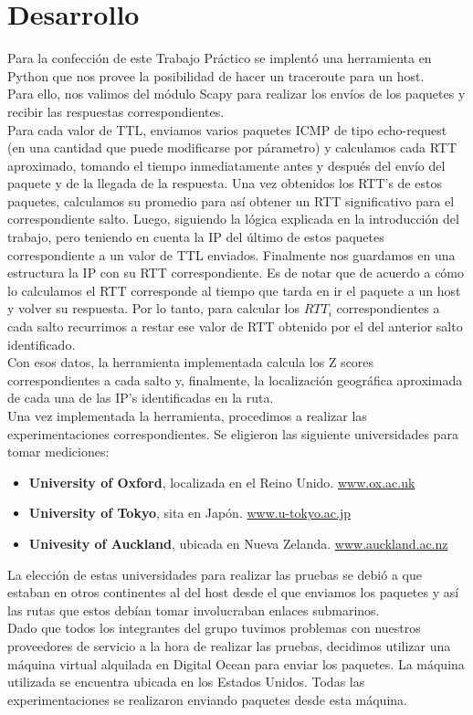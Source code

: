 \section{Desarrollo}

\indent \indent Para la confección de este Trabajo Práctico se implentó una herramienta en Python que nos provee la posibilidad de hacer un traceroute para un host. \\
\indent Para ello, nos valimos del módulo Scapy para realizar los envíos de los paquetes y recibir las respuestas correspondientes.\\
\indent Para cada valor de TTL, enviamos varios paquetes ICMP de tipo echo-request (en una cantidad que puede modificarse por párametro) y calculamos cada RTT aproximado, tomando el tiempo inmediatamente antes y después del envío del paquete y de la llegada de la respuesta. Una vez obtenidos los RTT's de estos paquetes, calculamos su promedio para así obtener un RTT significativo para el correspondiente salto. Luego, siguiendo la lógica explicada en la introducción del trabajo, pero teniendo en cuenta la IP del último de estos paquetes correspondiente a un valor de TTL enviados. Finalmente nos guardamos en una estructura la IP con su RTT correspondiente. Es de notar que de acuerdo a cómo lo calculamos el RTT corresponde al tiempo que tarda en ir el paquete a un host y volver su respuesta. Por lo tanto, para calcular los $RTT_i$ correspondientes a cada salto recurrimos a restar ese valor de RTT obtenido por el del anterior salto identificado.\\
\indent Con esos datos, la herramienta implementada calcula los Z scores correspondientes a cada salto y, finalmente, la localización geográfica aproximada de cada una de las IP's identificadas en la ruta.\\
\indent Una vez implementada la herramienta, procedimos a realizar las experimentaciones correspondientes. Se eligieron las siguiente universidades para tomar mediciones:\\
\begin{itemize}
\item \textbf{University of Oxford}, localizada en el Reino Unido. \url{www.ox.ac.uk}
\item \textbf{University of Tokyo}, sita en Japón. \url{www.u-tokyo.ac.jp}
\item \textbf{Univesity of Auckland}, ubicada en Nueva Zelanda. \url{www.auckland.ac.nz}
\end{itemize}

\indent La elección de estas universidades para realizar las pruebas se debió a que estaban en otros continentes al del host desde el que enviamos los paquetes y así las rutas que estos debían tomar involucraban enlaces submarinos.\\
\indent Dado que todos los integrantes del grupo tuvimos problemas con nuestros proveedores de servicio a la hora de realizar las pruebas, decidimos utilizar una máquina virtual alquilada en Digital Ocean para enviar los paquetes. La máquina utilizada se encuentra ubicada en los Estados Unidos. Todas las experimentaciones se realizaron enviando paquetes desde esta máquina.\\
